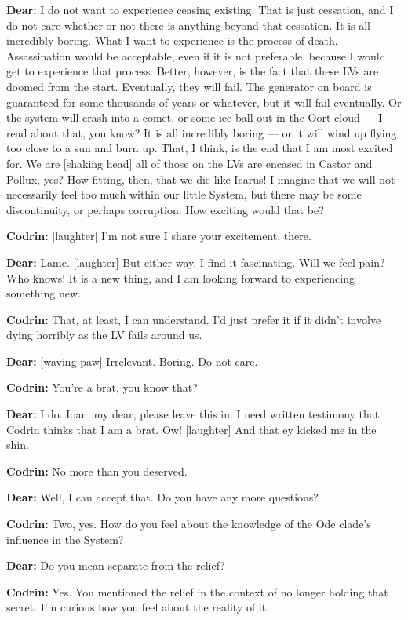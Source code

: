 \textbf{Dear:} I do not want to experience ceasing existing. That is just cessation, and I do not care whether or not there is anything beyond that cessation. It is all incredibly boring. What I want to experience is the process of death. Assassination would be acceptable, even if it is not preferable, because I would get to experience that process. Better, however, is the fact that these LVs are doomed from the start. Eventually, they will fail. The generator on board is guaranteed for some thousands of years or whatever, but it will fail eventually. Or the system will crash into a comet, or some ice ball out in the Oort cloud — I read about that, you know? It is all incredibly boring — or it will wind up flying too close to a sun and burn up. That, I think, is the end that I am most excited for. We are {[}shaking head{]} all of those on the LVs are encased in Castor and Pollux, yes? How fitting, then, that we die like Icarus! I imagine that we will not necessarily feel too much within our little System, but there may be some discontinuity, or perhaps corruption. How exciting would that be?

\textbf{Codrin:} {[}laughter{]} I'm not sure I share your excitement, there.

\textbf{Dear:} Lame. {[}laughter{]} But either way, I find it fascinating. Will we feel pain? Who knows! It is a new thing, and I am looking forward to experiencing something new.

\textbf{Codrin:} That, at least, I can understand. I'd just prefer it if it didn't involve dying horribly as the LV fails around us.

\textbf{Dear:} {[}waving paw{]} Irrelevant. Boring. Do not care.

\textbf{Codrin:} You're a brat, you know that?

\textbf{Dear:} I do. Ioan, my dear, please leave this in. I need written testimony that Codrin thinks that I am a brat. Ow! {[}laughter{]} And that ey kicked me in the shin.

\textbf{Codrin:} No more than you deserved.

\textbf{Dear:} Well, I can accept that. Do you have any more questions?

\textbf{Codrin:} Two, yes. How do you feel about the knowledge of the Ode clade's influence in the System?

\textbf{Dear:} Do you mean separate from the relief?

\textbf{Codrin:} Yes. You mentioned the relief in the context of no longer holding that secret. I'm curious how you feel about the reality of it.

